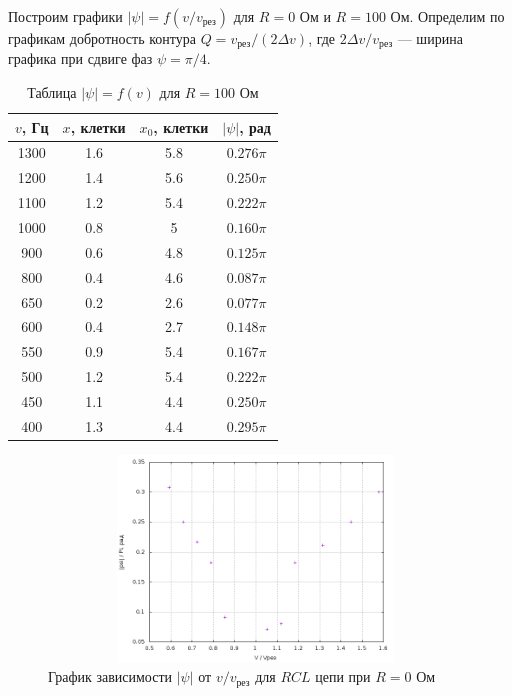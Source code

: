 \documentclass[12pt]{article}
\begin{document}
\begin{enumerate}
		Построим графики $|\psi| = f(v/v_\text{рез})$ для $R = 0$ Ом и $R = 100$ Ом. Определим по графикам добротность контура $Q = v_\text{рез} / \left(2\Delta v\right)$, где $2 \Delta v / v_\text{рез}$ --- ширина графика при сдвиге фаз $\psi = \pi / 4$.
		\newpage		
		\begin{table}[h!]
			\centering
			\begin{tabular}{|c|c|c|c|}
			\hline
			$v$, Гц  &  $x$, клетки & $x_0$, клетки & $|\psi|$, рад \\
			\hline
 			1300 & 1.6 & 5.8 & $0.276 \pi$ \\
 			\hline 			
 			1200 & 1.4 & 5.6 & $0.250 \pi$\\
 			\hline
 			1100 & 1.2 & 5.4 & $0.222 \pi$  \\
 			\hline
 			1000 & 0.8 & 5 & $0.160 \pi$\\
 			\hline
 		    900 & 0.6 & 4.8 & $0.125 \pi$\\ 						
			\hline
			800 & 0.4 & 4.6 & $0.087 \pi$\\
			\hline
			\hline	
			650 & 0.2 & 2.6 & $0.077 \pi$\\
 			\hline
 			600 & 0.4 & 2.7 & $0.148 \pi$  \\
 			\hline
 			550 & 0.9 & 5.4 & $0.167 \pi$\\
 			\hline
 		    500 & 1.2 & 5.4 & $0.222 \pi$\\
 			\hline
 			450 & 1.1 & 4.4 & $0.250 \pi$\\ 
 			\hline
 			400 & 1.3 & 4.4 & $0.295 \pi$\\						
			\hline
			\end{tabular}
			\captionsetup{labelformat = empty}
			\caption{Таблица $|\psi| = f(v)$ для $R = 100$ Ом}
			\label{table6}
		\end{table}
		\begin{figure}[h!]
			\centering
			\includegraphics[width = 11cm,height = 5.5cm]{plot3.png}
			\caption{График зависимости $|\psi|$ от $ v/v_\text{рез}$ для $RCL$ цепи при $R = 0$ Ом}

\end{figure}
\end{enumerate}
\end{document}
